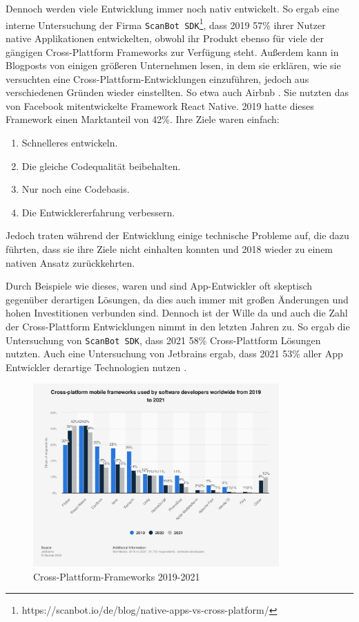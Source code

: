 Dennoch werden viele Entwicklung immer noch nativ entwickelt. So ergab eine interne Untersuchung der Firma \verb|ScanBot SDK|\footnote{https://scanbot.io/de/blog/native-apps-vs-cross-platform/}, dass 2019 57\% ihrer Nutzer native Applikationen entwickelten, obwohl ihr Produkt ebenso für viele der gängigen Cross-Plattform Frameworks zur Verfügung steht. Außerdem kann in Blogposts von einigen größeren Unternehmen lesen, in dem sie erklären, wie sie versuchten eine  Cross-Plattform-Entwicklungen einzuführen, jedoch aus verschiedenen Gründen  wieder einstellten. So etwa auch Airbnb \cite{Airbnb_react_goals}. Sie nutzten das von Facebook mitentwickelte Framework React Native. 2019 hatte dieses Framework einen Marktanteil von 42\%. 
\break
Ihre Ziele waren einfach:
\begin{enumerate}
    \item Schnelleres entwickeln.
    \item Die gleiche Codequalität beibehalten.
    \item Nur noch eine Codebasis.
    \item Die Entwicklererfahrung verbessern.
\end{enumerate}
Jedoch traten während der Entwicklung einige technische Probleme auf, die dazu führten, dass sie ihre Ziele nicht einhalten konnten und 2018 wieder zu einem nativen Ansatz zurückkehrten.

Durch Beispiele wie dieses, waren und sind App-Entwickler oft skeptisch gegenüber derartigen Lösungen, da dies auch immer mit großen Änderungen und hohen Investitionen verbunden sind. Dennoch ist der Wille da und auch die Zahl der Cross-Plattform Entwicklungen nimmt in den letzten Jahren zu. So ergab die Untersuchung von \verb|ScanBot SDK|, dass 2021 58\% Cross-Plattform Lösungen nutzten. Auch eine Untersuchung von Jetbrains ergab, dass 2021 53\% aller App Entwickler derartige Technologien nutzen \cite{JetBrains_miscellaneous_2021}.

\begin{figure}[ht]
  \centering
  \includegraphics[height=7cm,keepaspectratio]{images/cross-platform-mobile-frameworks.png} 
  \caption[Statistik Cross-Plattform-Frameworks]{Cross-Plattform-Frameworks 2019-2021 \cite{statist_CP_Framework}}
  \label{fig:statista_cross_plattform}
\end{figure}

